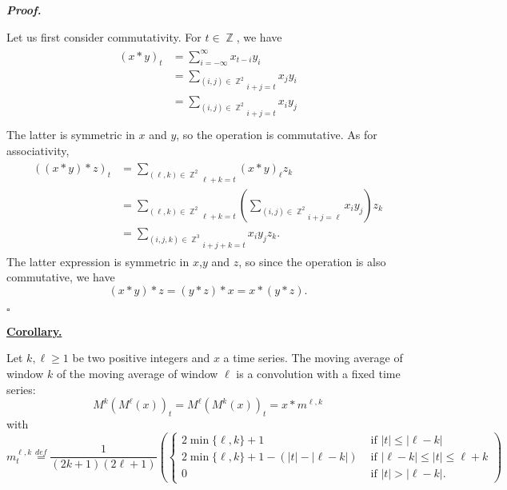 \documentclass[11 pt]{article}
\newcommand{\1}{\operatorname{\mathbb I}}
\newcommand{\Z}{\operatorname{\mathbb Z}}
\newcommand{\defn}{\overset{def}{=}}
\newcounter{env} %
\newenvironment{abb} %
{
	\begin{mdframed}[bottomline=false,topline=false,leftline=false,rightline=false,nobreak,leftmargin=-10 pt,rightmargin=0 pt,skipabove=0 pt,skipbelow=0 pt]
}
{
	\end{mdframed}
}
\newenvironment{corh}
{\par
	\noindent \begin{abb} \textbf{\underline{Corollary.}} \par
	\nopagebreak%
	\par
	\itshape%
}
{%
	\par
	\end{abb}
}
\renewenvironment{proof}
{\par
	\begin{mdframed}[skipabove=12 pt,bottomline=false,topline=false,rightline=false]%
	\noindent \textit{\textbf{Proof.}} 
}
{%
	\end{mdframed}\par
	\begin{flushright} \vspace{-35 pt} $\square$ \end{flushright}
	\vspace{-20 pt}
}
\begin{document}
\begin{proof}
    Let us first consider commutativity. For $t \in \Z$, we have 
    \begin{gather*}
        \begin{aligned}
            (x * y)_t
                & = \sum_{i=-\infty}^{\infty} x_{t-i} y_i \\
                & = \underset{i+j = t}{\sum_{(i,j) \in \Z^2}} x_j y_i \\
                & = \underset{i+j = t}{\sum_{(i,j) \in \Z^2}} x_i y_j \\
        \end{aligned}
    \end{gather*}
    The latter is symmetric in $x$ and $y$, so the operation is commutative. As for associativity,
    \begin{gather*}
        \begin{aligned}
            ((x * y) * z)_t 
                & = \underset{\ell+k = t}{\sum_{(\ell,k) \in \Z^2}} (x * y)_{\ell} z_k \\
                & = \underset{\ell+k = t}{\sum_{(\ell,k) \in \Z^2}} \left( \underset{i+j = \ell}{\sum_{(i,j) \in \Z^2}} x_i y_j  \right) z_k \\
                & = \underset{i+j+k = t}{\sum_{(i,j,k) \in \Z^3}} x_i y_j z_k.
        \end{aligned}
    \end{gather*}
    The latter expression is symmetric in $x$,$y$ and $z$, so since the operation is also commutative, we have
    \[
        (x * y) * z = (y * z) * x = x * (y * z). 
    \]        
\end{proof}

\begin{corh}
    Let $k,\ell \ge 1$ be two positive integers and $x$ a time series. The moving average of window $k$ of the moving average of window $\ell$ is a convolution with a fixed time series:
    \[
        M^k(M^{\ell}(x))_t = M^{\ell}(M^k(x))_t = x * m^{\ell,k}
    \]
    with 
    \[
        m^{\ell,k}_t \defn \frac 1{(2k+1)(2\ell+1)} \left(
            \begin{cases}
                2 \min \{\ell, k\} + 1                      & \text{ if } |t| \le |\ell - k|                \\
                2 \min \{\ell, k\} + 1 - (|t| - |\ell - k|) & \text{ if } |\ell - k| \le |t| \le \ell + k   \\
                0                                           & \text{ if } |t| > |\ell - k|. 
            \end{cases}
        \right)
    \]
\end{corh}
\end{document}
